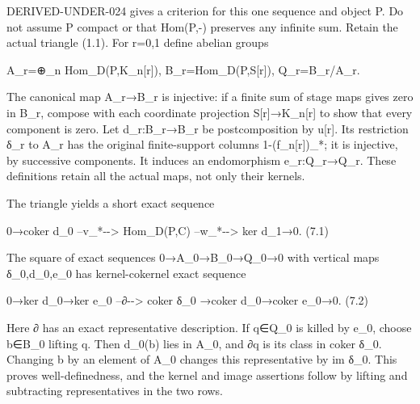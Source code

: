 \documentclass[11pt]{article}
\begin{document}
DERIVED-UNDER-024 gives a criterion for this one sequence and object P. Do not assume P compact or that Hom(P,\allowbreak{}-)\allowbreak{} preserves any infinite sum. Retain the actual triangle (1.1)\allowbreak{}. For r\allowbreak{}=0,\allowbreak{}1 define abelian groups

A\_\allowbreak{}r\allowbreak{}=\allowbreak{}⊕\_\allowbreak{}n Hom\_\allowbreak{}D(P,\allowbreak{}K\_\allowbreak{}n[r]\allowbreak{})\allowbreak{},\allowbreak{} B\_\allowbreak{}r\allowbreak{}=Hom\_\allowbreak{}D(P,\allowbreak{}S[r]\allowbreak{})\allowbreak{},\allowbreak{} Q\_\allowbreak{}r\allowbreak{}=B\_\allowbreak{}r/\allowbreak{}A\_\allowbreak{}r.

The canonical map A\_\allowbreak{}r\allowbreak{}→B\_\allowbreak{}r is injective:\allowbreak{} if a finite sum of stage maps gives zero in B\_\allowbreak{}r,\allowbreak{} compose with each coordinate projection S[r]\allowbreak{}\allowbreak{}→K\_\allowbreak{}n[r]\allowbreak{} to show that every component is zero. Let d\_\allowbreak{}r:\allowbreak{}B\_\allowbreak{}r\allowbreak{}→B\_\allowbreak{}r be postcomposition by u[r]\allowbreak{}. Its restriction δ\_\allowbreak{}r to A\_\allowbreak{}r has the original finite-support columns 1-(f\_\allowbreak{}n[r]\allowbreak{})\allowbreak{}\_\allowbreak{}*; it is injective,\allowbreak{} by successive components. It induces an endomorphism e\_\allowbreak{}r:\allowbreak{}Q\_\allowbreak{}r\allowbreak{}→Q\_\allowbreak{}r. These definitions retain all the actual maps,\allowbreak{} not only their kernels.

The triangle yields a short exact sequence

0\allowbreak{}→coker d\_\allowbreak{}0 --v\_\allowbreak{}*-\allowbreak{}-> Hom\_\allowbreak{}D(P,\allowbreak{}C)\allowbreak{} --w\_\allowbreak{}*-\allowbreak{}-> ker d\_\allowbreak{}1\allowbreak{}→0. (7.1)\allowbreak{}

The square of exact sequences 0\allowbreak{}→A\_\allowbreak{}0\allowbreak{}→B\_\allowbreak{}0\allowbreak{}→Q\_\allowbreak{}0\allowbreak{}→0 with vertical maps δ\_\allowbreak{}0,\allowbreak{}d\_\allowbreak{}0,\allowbreak{}e\_\allowbreak{}0 has kernel-cokernel exact sequence

0\allowbreak{}→ker d\_\allowbreak{}0\allowbreak{}→ker e\_\allowbreak{}0 --∂-\allowbreak{}-> coker δ\_\allowbreak{}0 \allowbreak{}→coker d\_\allowbreak{}0\allowbreak{}→coker e\_\allowbreak{}0\allowbreak{}→0. (7.2)\allowbreak{}

Here ∂ has an exact representative description. If q\allowbreak{}∈Q\_\allowbreak{}0 is killed by e\_\allowbreak{}0,\allowbreak{} choose b\allowbreak{}∈B\_\allowbreak{}0 lifting q. Then d\_\allowbreak{}0(b)\allowbreak{} lies in A\_\allowbreak{}0,\allowbreak{} and ∂q is its class in coker δ\_\allowbreak{}0. Changing b by an element of A\_\allowbreak{}0 changes this representative by im δ\_\allowbreak{}0. This proves well-definedness,\allowbreak{} and the kernel and image assertions follow by lifting and subtracting representatives in the two rows.
\end{document}
